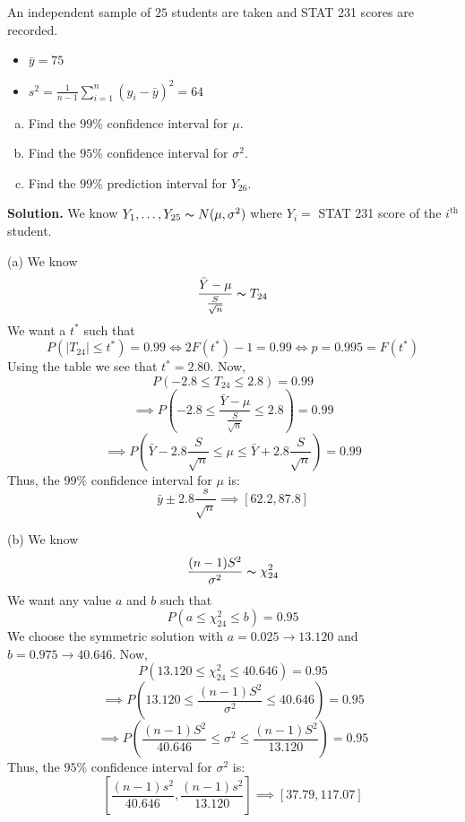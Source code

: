 \begin{exbox}
    \begin{example}
        An independent sample of $ 25 $ students are taken and STAT 231 scores are recorded.
        \begin{itemize}
            \item $ \bar{y}=75 $
            \item $ s^2=\frac{1}{n-1} \sum\limits_{i=1}^{n} (y_i-\bar{y})^2=64 $
        \end{itemize}
        \begin{enumerate}[(a)]
            \item Find the $ 99\% $ confidence interval for $ \mu $.
            \item Find the $ 95\% $ confidence interval for $ \sigma^2 $.
            \item Find the $ 99\% $ prediction interval for $ Y_{26} $.
        \end{enumerate}
        \textbf{Solution.} We know $ Y_1,\ldots ,Y_{25} \thicksim N(\mu,\sigma^2) $
        where $ Y_i= $ STAT 231 score of the $ i^{\text{th}} $ student.

        (a) We know
        \[ \frac{\bar{Y}-\mu}{\frac{S}{\sqrt{n}}} \thicksim T_{24} \]
        We want a $ t^* $ such that
        \[ P(|T_{24}|\leqslant t^*)=0.99\iff 2F(t^*)-1=0.99\iff p=0.995=F(t^*) \]
        Using the table we see that $ t^*=2.80 $. Now,
        \[ P(-2.8\leqslant T_{24}\leqslant 2.8)=0.99 \]
        \[ \implies P\left(-2.8\leqslant \frac{\bar{Y}-\mu}{\frac{S}{\sqrt{n}}}
            \leqslant 2.8\right)=0.99 \]
        \[ \implies P\left(\bar{Y}-2.8 \frac{S}{\sqrt{n}}\leqslant \mu\leqslant \bar{Y}+
            2.8 \frac{S}{\sqrt{n}}\right)=0.99 \]
        Thus, the $ 99\% $ confidence interval for $ \mu $ is:
        \[ \bar{y}\pm 2.8 \frac{s}{\sqrt{n}}\implies \left[ 62.2, 87.8 \right] \]

        (b) We know
        \[ \frac{(n-1)S^2}{\sigma^2} \thicksim \chi^2_{24}  \]
        We want any value $ a $ and $ b $ such that
        \[ P(a\leqslant \chi^2_{24}\leqslant b)=0.95 \]
        We choose the symmetric solution with $ a=0.025\rightarrow 13.120 $ and $ b=0.975\rightarrow 40.646 $.
        Now,
        \[ P\left( 13.120\leqslant \chi^2_{24}\leqslant 40.646 \right)=0.95 \]
        \[ \implies P\left( 13.120\leqslant \frac{(n-1) S^2}{\sigma^2}\leqslant 40.646 \right)=0.95 \]
        \[ \implies P\left( \frac{(n-1)S^2}{40.646}\leqslant \sigma^2 \leqslant \frac{(n-1)S^2}{13.120} \right)=0.95 \]
        Thus, the $ 95\% $ confidence interval for $ \sigma^2 $ is:
        \[ \left[ \frac{(n-1)s^2}{40.646} , \frac{(n-1)s^2}{13.120} \right]\implies
            \left[ 37.79, 117.07 \right] \]


\end{example}
\end{exbox}
